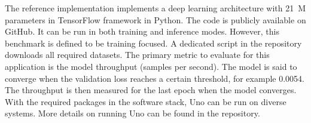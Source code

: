  The reference implementation implements a deep learning architecture with 21~M parameters in TensorFlow framework in Python. The code is publicly available on GitHub. It can be run in both training and inference modes. However, this benchmark is defined to be training focused.  A dedicated script in the repository downloads all required datasets. The primary metric to evaluate for this application is the model throughput (samples per second). The model is said to converge when the validation loss reaches a certain threshold, for example 0.0054. The throughput is then measured for the last epoch when the model converges. With the required packages in the  software stack, Uno can be run on diverse systems. More details on running Uno can be found in the repository. 


